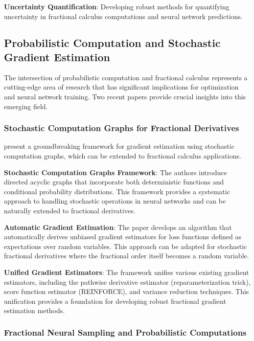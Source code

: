 \textbf{Uncertainty Quantification}: Developing robust methods for quantifying uncertainty in fractional calculus computations and neural network predictions.

\subsection{Probabilistic Computation and Stochastic Gradient Estimation}

The intersection of probabilistic computation and fractional calculus represents a cutting-edge area of research that has significant implications for optimization and neural network training. Two recent papers provide crucial insights into this emerging field.

\subsubsection{Stochastic Computation Graphs for Fractional Derivatives}

\citet{schulman2015gradient} present a groundbreaking framework for gradient estimation using stochastic computation graphs, which can be extended to fractional calculus applications.

\textbf{Stochastic Computation Graphs Framework}: The authors introduce directed acyclic graphs that incorporate both deterministic functions and conditional probability distributions. This framework provides a systematic approach to handling stochastic operations in neural networks and can be naturally extended to fractional derivatives.

\textbf{Automatic Gradient Estimation}: The paper develops an algorithm that automatically derives unbiased gradient estimators for loss functions defined as expectations over random variables. This approach can be adapted for stochastic fractional derivatives where the fractional order itself becomes a random variable.

\textbf{Unified Gradient Estimators}: The framework unifies various existing gradient estimators, including the pathwise derivative estimator (reparameterization trick), score function estimator (REINFORCE), and variance reduction techniques. This unification provides a foundation for developing robust fractional gradient estimation methods.

\subsubsection{Fractional Neural Sampling and Probabilistic Computations}

